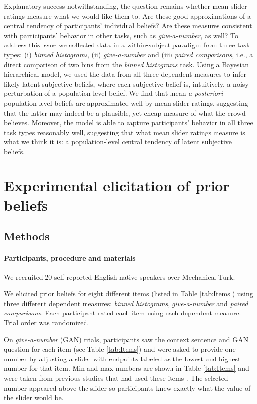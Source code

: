 \documentclass[10pt,letterpaper]{article}
\newcommand{\tableref}[1]{Table \ref{#1}}
\begin{document}
Explanatory success notwithstanding, the question remains whether mean slider ratings measure
what we would like them to. Are these good approximations of a central tendency of participants'
individual beliefs? Are these measures consistent with participants' behavior in other tasks, such
as \emph{give-a-number}, as well? To address this issue we collected data in a within-subject paradigm 
from three task types: (i) \emph{binned histograms}, (ii) \emph{give-a-number} and (iii)
\emph{paired comparisons}, i.e., a direct comparison of two bins from the \emph{binned
  histograms} task. Using a Bayesian hierarchical model, we used the data from all three
dependent measures to infer likely latent subjective beliefs, where each subjective belief is,
intuitively, a noisy perturbation of a population-level belief. We find that mean \emph{a
  posteriori} population-level beliefs are approximated well by mean slider ratings, suggesting
that the latter may indeed be a plausible, yet cheap measure of what the crowd believes.
Moreover, the model is able to capture participants' behavior in all three task types reasonably
well, suggesting that what mean slider ratings measure is what we think it is: a population-level
central tendency of latent subjective beliefs.

\section{Experimental elicitation of prior beliefs}

\subsection{Methods} 

\paragraph{Participants, procedure and materials} We recruited 20 self-reported English native speakers  over Mechanical Turk.


We elicited prior beliefs for eight different items (listed in
\tableref{tab:Items}) using three different dependent measures: \emph{binned histograms},
\emph{give-a-number} and \emph{paired comparisons}. Each participant rated each item using each
dependent measure. Trial order was randomized.



On \emph{give-a-number} (GAN) trials, participants saw the context sentence and GAN question
for each item (see \tableref{tab:Items}) and were asked to provide one number by adjusting a
slider with endpoints labeled as the lowest and highest number for that item. Min and max
numbers are shown in \tableref{tab:Items} and were taken from previous studies that had used
these items
\cite{DegenTessler2015:Wonky-worlds:-L,SchollerFranke2015:Semantic-values,KaoWu2014:Nonliteral-Unde}. The
selected number appeared above the slider so participants knew exactly what the value of the
slider would be.
\end{document}
